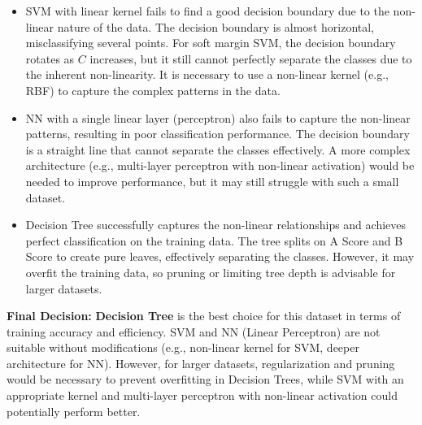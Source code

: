 \documentclass[a4paper,12pt]{article}
\begin{document}
\begin{itemize}
    \item SVM with linear kernel fails to find a good decision boundary due to the non-linear nature of the data. The decision boundary is almost horizontal, misclassifying several points. For soft margin SVM, the decision boundary rotates as $C$ increases, but it still cannot perfectly separate the classes due to the inherent non-linearity. It is necessary to use a non-linear kernel (e.g., RBF) to capture the complex patterns in the data.
    \item NN with a single linear layer (perceptron) also fails to capture the non-linear patterns, resulting in poor classification performance. The decision boundary is a straight line that cannot separate the classes effectively. A more complex architecture (e.g., multi-layer perceptron with non-linear activation) would be needed to improve performance, but it may still struggle with such a small dataset.
    \item Decision Tree successfully captures the non-linear relationships and achieves perfect classification on the training data. The tree splits on A Score and B Score to create pure leaves, effectively separating the classes. However, it may overfit the training data, so pruning or limiting tree depth is advisable for larger datasets.
\end{itemize}

\textbf{Final Decision: } \textbf{Decision Tree} is the best choice for this dataset in terms of training accuracy and efficiency. SVM and NN (Linear Perceptron) are not suitable without modifications (e.g., non-linear kernel for SVM, deeper architecture for NN). However, for larger datasets, regularization and pruning would be necessary to prevent overfitting in Decision Trees, while SVM with an appropriate kernel and multi-layer perceptron with non-linear activation could potentially perform better.
\end{document}
